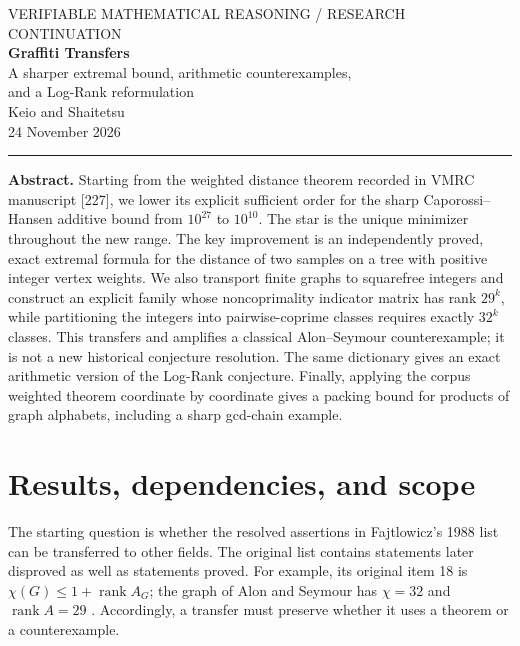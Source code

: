 \documentclass[11pt,a4paper]{article}
\theoremstyle{definition}
\theoremstyle{remark}
\DeclareMathOperator{\rank}{rank}
\numberwithin{equation}{section}
\begin{document}
\begin{center}
{\small\color{quiet}VERIFIABLE MATHEMATICAL REASONING / RESEARCH CONTINUATION}\\[9pt]
{\LARGE\bfseries\color{ink}Graffiti Transfers}\\[6pt]
{\Large A sharper extremal bound, arithmetic counterexamples,\\[3pt]
and a Log-Rank reformulation}\\[10pt]
{\large Keio and Shaitetsu}\\[4pt]
24 November 2026
\end{center}
\vspace{3pt}\hrule\vspace{9pt}

\textbf{Abstract.}
Starting from the weighted distance theorem recorded in VMRC manuscript
[227], we lower its explicit sufficient order for the sharp
Caporossi--Hansen additive bound from $10^{27}$ to $10^{10}$.
The star is the unique minimizer throughout the new range.
The key improvement is an independently proved, exact extremal formula
for the distance of two samples on a tree with positive integer vertex
weights. We also transport finite graphs to squarefree integers and
construct an explicit family whose noncoprimality indicator matrix has
rank $29^k$, while partitioning the integers into pairwise-coprime classes
requires exactly $32^k$ classes. This transfers and amplifies a classical
Alon--Seymour counterexample; it is not a new historical conjecture
resolution. The same dictionary gives an exact arithmetic version of
the Log-Rank conjecture. Finally, applying the corpus weighted theorem
coordinate by coordinate gives a packing bound for products of graph
alphabets, including a sharp gcd-chain example.

\section{Results, dependencies, and scope}

The starting question is whether the resolved assertions in
Fajtlowicz's 1988 list can be transferred to other fields.
The original list contains statements later disproved as well as
statements proved. For example, its original item 18 is
$\chi(G)\le 1+\rank A_G$; the graph of Alon and Seymour has
$\chi=32$ and $\rank A=29$ \cite{fajtlowicz,alonseymour}.
Accordingly, a transfer must preserve whether it uses a theorem
or a counterexample.
\end{document}
